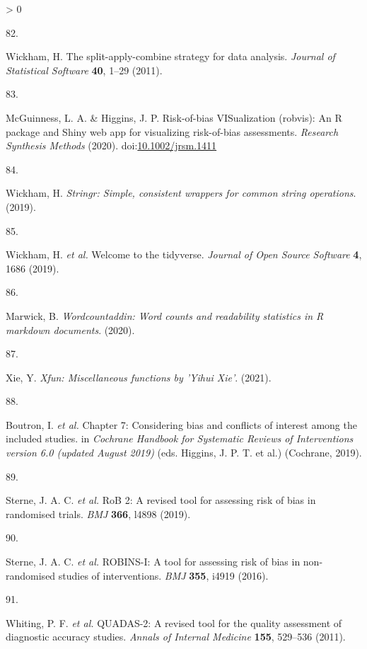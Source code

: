 \documentclass[a4paper, twoside]{templates/ociamthesis}
\newlength{\cslhangindent}
\newlength{\csllabelwidth}
\newenvironment{CSLReferences}[3] %
 {%
  \setlength{\parindent}{0pt}
  \ifodd #1 \everypar{\setlength{\hangindent}{\cslhangindent}}\ignorespaces\fi
  \ifnum #2 > 0
  \setlength{\parskip}{#2\baselineskip}
  \fi
 }%
 {}
\newcommand{\CSLLeftMargin}[1]{\parbox[t]{\maxof{\widthof{#1}}{\csllabelwidth}}{#1}}
\newcommand{\CSLRightInline}[1]{\parbox[t]{\linewidth - \csllabelwidth}{#1}}
\begin{document}
\begin{CSLReferences}{0}{0}
\leavevmode\hypertarget{ref-plyr}{}%
\CSLLeftMargin{82. }
\CSLRightInline{Wickham, H. The split-apply-combine strategy for data analysis. \emph{Journal of Statistical Software} \textbf{40}, 1--29 (2011).}

\leavevmode\hypertarget{ref-robvis}{}%
\CSLLeftMargin{83. }
\CSLRightInline{McGuinness, L. A. \& Higgins, J. P. Risk-of-bias {VISualization} (robvis): {An R} package and {Shiny} web app for visualizing risk-of-bias assessments. \emph{Research Synthesis Methods} (2020). doi:\href{https://doi.org/10.1002/jrsm.1411}{10.1002/jrsm.1411}}

\leavevmode\hypertarget{ref-stringr}{}%
\CSLLeftMargin{84. }
\CSLRightInline{Wickham, H. \emph{Stringr: {Simple}, consistent wrappers for common string operations}. (2019).}

\leavevmode\hypertarget{ref-tidyverse}{}%
\CSLLeftMargin{85. }
\CSLRightInline{Wickham, H. \emph{et al.} Welcome to the {tidyverse}. \emph{Journal of Open Source Software} \textbf{4}, 1686 (2019).}

\leavevmode\hypertarget{ref-wordcountaddin}{}%
\CSLLeftMargin{86. }
\CSLRightInline{Marwick, B. \emph{Wordcountaddin: {Word} counts and readability statistics in {R} markdown documents}. (2020).}

\leavevmode\hypertarget{ref-xfun}{}%
\CSLLeftMargin{87. }
\CSLRightInline{Xie, Y. \emph{Xfun: {Miscellaneous} functions by '{Yihui Xie}'}. (2021).}

\leavevmode\hypertarget{ref-cochranechpt7}{}%
\CSLLeftMargin{88. }
\CSLRightInline{Boutron, I. \emph{et al.} Chapter 7: {Considering} bias and conflicts of interest among the included studies. in \emph{Cochrane {Handbook} for {Systematic Reviews} of {Interventions} version 6.0 (updated {August} 2019)} (eds. Higgins, J. P. T. et al.) ({Cochrane}, 2019).}

\leavevmode\hypertarget{ref-sterne2019rob}{}%
\CSLLeftMargin{89. }
\CSLRightInline{Sterne, J. A. C. \emph{et al.} {RoB} 2: A revised tool for assessing risk of bias in randomised trials. \emph{BMJ} \textbf{366}, l4898 (2019).}

\leavevmode\hypertarget{ref-sterne2016robins}{}%
\CSLLeftMargin{90. }
\CSLRightInline{Sterne, J. A. C. \emph{et al.} {ROBINS}-{I}: A tool for assessing risk of bias in non-randomised studies of interventions. \emph{BMJ} \textbf{355}, i4919 (2016).}

\leavevmode\hypertarget{ref-whiting2011quadas}{}%
\CSLLeftMargin{91. }
\CSLRightInline{Whiting, P. F. \emph{et al.} {QUADAS}-2: A revised tool for the quality assessment of diagnostic accuracy studies. \emph{Annals of Internal Medicine} \textbf{155}, 529--536 (2011).}


\end{CSLReferences}
\end{document}
